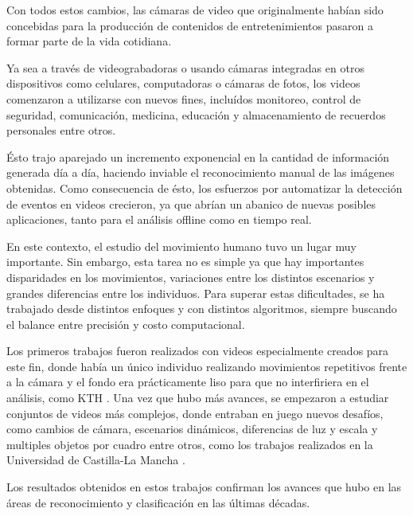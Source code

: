 Con todos estos cambios, las cámaras de video que originalmente habían sido concebidas para la producción de contenidos de entretenimientos pasaron a
formar parte de la vida cotidiana.

Ya sea a través de videograbadoras o usando cámaras integradas en otros dispositivos como celulares, computadoras o cámaras de fotos, los videos
comenzaron a utilizarse con nuevos fines, incluídos monitoreo, control de seguridad, comunicación, medicina,  educación y almacenamiento de recuerdos
personales entre otros.

Ésto trajo aparejado un incremento exponencial en la cantidad de información generada día a día, haciendo inviable el reconocimiento manual de las
imágenes obtenidas. Como consecuencia de ésto, los esfuerzos por automatizar la detección de eventos en videos crecieron, ya que abrían un abanico
de nuevas posibles aplicaciones, tanto para el análisis offline como en tiempo real.

En este contexto, el estudio del movimiento humano tuvo un lugar muy importante. Sin embargo, esta tarea no es simple ya que hay importantes disparidades
en los movimientos, variaciones entre los distintos escenarios y grandes diferencias entre los individuos. Para superar estas dificultades, se ha trabajado
desde distintos enfoques y con distintos algoritmos, siempre buscando el balance entre precisión y costo computacional.

Los primeros trabajos fueron realizados con videos especialmente creados para este fin, donde había un único individuo realizando movimientos repetitivos
frente a la cámara y el fondo era prácticamente liso para que no interfiriera en el análisis, como KTH \parencite{schuldt2004recognizing}. Una vez que hubo
más avances, se empezaron a estudiar conjuntos de videos más complejos, donde entraban en juego nuevos desafíos, como cambios de cámara, escenarios
dinámicos, diferencias de luz y escala y multiples objetos por cuadro entre otros, como los trabajos realizados en la Universidad de Castilla-La
Mancha \parencite{nievas2011violence, deniz2014fast}.

Los resultados obtenidos en estos trabajos confirman los avances que hubo en las áreas de reconocimiento y clasificación en las últimas décadas.





\iffalse
Un método común y que ha resultado ser eficiente para obtener información a partir de imágenes es la utilización de descriptores.
Estos descriptores informan acerca de las características visuales de la imagen, describiendo características elementales como la forma, el color,
la textura y la ubicación de elementos dentro de la misma.
Para extender esta idea al plano de los videos, lo que se hace es desglosar el video en las imágenes que lo componen (frames), para luego analizar por separado
cada una de ellas. Con esta información ya disponible se incorpora el factor temporal, siendo éste el eje en la relación entre los distintos frames, permitiendo,
por ejemplo, analizar variaciones de un frame a otro.
\fi
